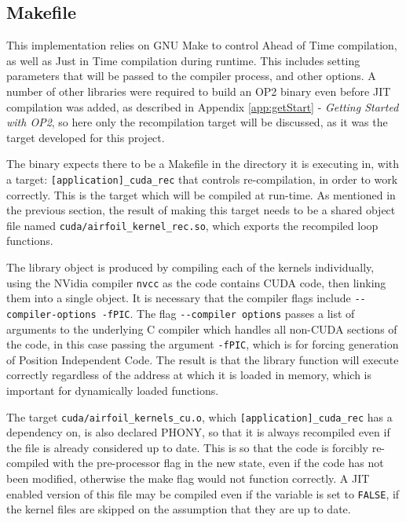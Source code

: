 \subsection{Makefile}
\label{ss:make}
This implementation relies on GNU Make to control Ahead of Time compilation, as well as Just in Time compilation during runtime. This includes setting parameters that will be passed to the compiler process, and other options. A number of other libraries were required to build an OP2 binary even before JIT compilation was added, as described in Appendix \ref{app:getStart} - \textit{Getting Started with OP2}, so here only the recompilation target will be discussed, as it was the target developed for this project.
\par
The binary expects there to be a Makefile in the directory it is executing in, with a target: \verb|[application]_cuda_rec| that controls re-compilation, in order to work correctly. This is the target which will be compiled at run-time. As mentioned in the previous section, the result of making this target needs to be a shared object file named \verb|cuda/airfoil_kernel_rec.so|, which exports the recompiled loop functions.
\par
The library object is produced by compiling each of the kernels individually, using the NVidia compiler \verb|nvcc| as the code contains CUDA code, then linking them into a single object. It is necessary that the compiler flags include \verb|--compiler-options -fPIC|. The flag \verb|--compiler options| passes a list of arguments to the underlying C compiler which handles all non-CUDA sections of the code, in this case passing the argument \verb|-fPIC|, which is for forcing generation of Position Independent Code. The result is that the library function will execute correctly regardless of the address at which it is loaded in memory, which is important for dynamically loaded functions.
\par
The target \verb|cuda/airfoil_kernels_cu.o|, which \verb|[application]_cuda_rec| has a dependency on, is also declared PHONY, so that it is always recompiled even if the file is already considered up to date. This is so that the code is forcibly re-compiled with the pre-processor flag in the new state, even if the code has not been modified, otherwise the make flag would not function correctly. A JIT enabled version of this file may be compiled even if the variable is set to \verb|FALSE|, if the kernel files are skipped on the assumption that they are up to date.
